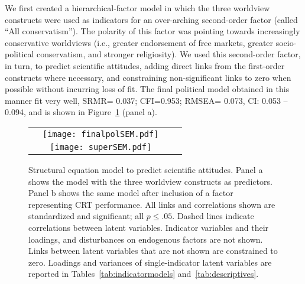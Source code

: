 \documentclass[fignum,man]{apa}\usepackage[]{graphicx}\usepackage[]{color}
\newcommand{\helv}[1]{{\Huge\fontfamily{phv}\selectfont{#1}}}
\begin{document}
We first created a hierarchical-factor model in which the three worldview constructs 
were used as indicators for an over-arching second-order factor (called ``All conservatism''). 
The polarity of this factor was pointing towards increasingly conservative worldviews (i.e., greater
endorsement of free markets, greater socio-political conservatism, and stronger religiosity). 
We used this second-order factor, in turn, to predict scientific 
attitudes, adding direct links from the first-order constructs where necessary,
and constraining non-significant links to zero when possible without
incurring loss of fit.
The final political model obtained in this manner fit very well,
SRMR=
0.037; 
CFI=0.953; RMSEA= 
0.073, CI:
0.053 -- 
0.094,
 and is shown in Figure~\ref{fig:finalpolSEM} (panel a).
\begin{figure}[tp] %
\begin{center}
\begin{tabular}{rcrc}
\raisebox{2.8in}{\bf \helv{a}} & \texttt{[image: finalpolSEM.pdf]} \\
\raisebox{2.8in}{\bf \helv{b}} & \texttt{[image: superSEM.pdf]}
\end{tabular}
\end{center}
	\caption{Structural equation model to predict scientific attitudes. 
		Panel a shows the model with the three worldview constructs as predictors.
		Panel b shows the same model after inclusion of a factor representing CRT performance.
		All links and correlations shown are 
		standardized and significant; all $p \leq .05$. Dashed lines indicate correlations between latent variables.
		Indicator variables and their loadings, and disturbances on endogenous factors are not
		shown. Links between latent variables that are not shown are 
		constrained to zero. 
		Loadings and variances of single-indicator latent 
		variables are reported in Tables~\ref{tab:indicatormodels}
		and~\ref{tab:descriptives}.}
	\label{fig:finalpolSEM}
\end{figure}
\end{document}
